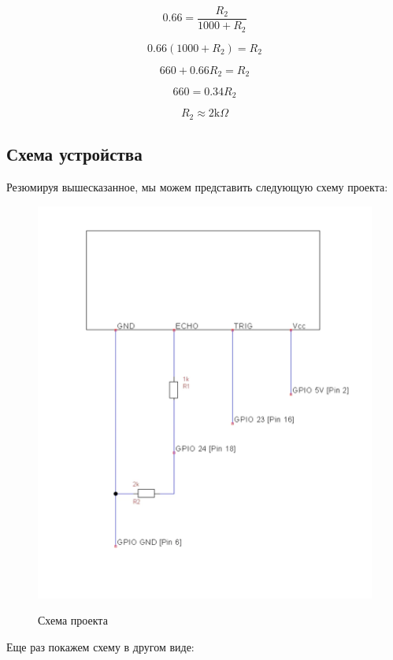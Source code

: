 \documentclass[a4paper, 14pt]{article}
\begin{document}
$$0.66=\frac{R_2}{1000+R_2}$$

$$0.66(1000+R_2) = R_2$$

$$660 + 0.66R_2 = R_2$$

$$660 = 0.34R_2$$

$$R_2 \approx 2\text{k}\Omega$$

\subsection{Схема устройства}

Резюмируя вышесказанное, мы можем представить следующую схему проекта:

\begin{figure}[H]
	\centering
	\includegraphics[width=12cm]{screenshots/3.png}\\
	\caption{Схема проекта}
\end{figure}

Еще раз покажем схему в другом виде:
\end{document}
